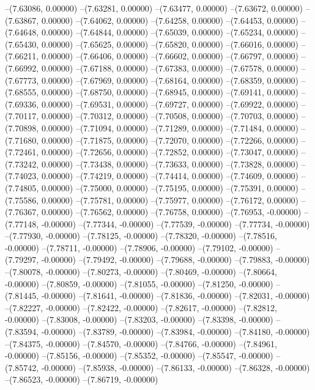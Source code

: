 --(7.63086, 0.00000)
--(7.63281, 0.00000)
--(7.63477, 0.00000)
--(7.63672, 0.00000)
--(7.63867, 0.00000)
--(7.64062, 0.00000)
--(7.64258, 0.00000)
--(7.64453, 0.00000)
--(7.64648, 0.00000)
--(7.64844, 0.00000)
--(7.65039, 0.00000)
--(7.65234, 0.00000)
--(7.65430, 0.00000)
--(7.65625, 0.00000)
--(7.65820, 0.00000)
--(7.66016, 0.00000)
--(7.66211, 0.00000)
--(7.66406, 0.00000)
--(7.66602, 0.00000)
--(7.66797, 0.00000)
--(7.66992, 0.00000)
--(7.67188, 0.00000)
--(7.67383, 0.00000)
--(7.67578, 0.00000)
--(7.67773, 0.00000)
--(7.67969, 0.00000)
--(7.68164, 0.00000)
--(7.68359, 0.00000)
--(7.68555, 0.00000)
--(7.68750, 0.00000)
--(7.68945, 0.00000)
--(7.69141, 0.00000)
--(7.69336, 0.00000)
--(7.69531, 0.00000)
--(7.69727, 0.00000)
--(7.69922, 0.00000)
--(7.70117, 0.00000)
--(7.70312, 0.00000)
--(7.70508, 0.00000)
--(7.70703, 0.00000)
--(7.70898, 0.00000)
--(7.71094, 0.00000)
--(7.71289, 0.00000)
--(7.71484, 0.00000)
--(7.71680, 0.00000)
--(7.71875, 0.00000)
--(7.72070, 0.00000)
--(7.72266, 0.00000)
--(7.72461, 0.00000)
--(7.72656, 0.00000)
--(7.72852, 0.00000)
--(7.73047, 0.00000)
--(7.73242, 0.00000)
--(7.73438, 0.00000)
--(7.73633, 0.00000)
--(7.73828, 0.00000)
--(7.74023, 0.00000)
--(7.74219, 0.00000)
--(7.74414, 0.00000)
--(7.74609, 0.00000)
--(7.74805, 0.00000)
--(7.75000, 0.00000)
--(7.75195, 0.00000)
--(7.75391, 0.00000)
--(7.75586, 0.00000)
--(7.75781, 0.00000)
--(7.75977, 0.00000)
--(7.76172, 0.00000)
--(7.76367, 0.00000)
--(7.76562, 0.00000)
--(7.76758, 0.00000)
--(7.76953, -0.00000)
--(7.77148, -0.00000)
--(7.77344, -0.00000)
--(7.77539, -0.00000)
--(7.77734, -0.00000)
--(7.77930, -0.00000)
--(7.78125, -0.00000)
--(7.78320, -0.00000)
--(7.78516, -0.00000)
--(7.78711, -0.00000)
--(7.78906, -0.00000)
--(7.79102, -0.00000)
--(7.79297, -0.00000)
--(7.79492, -0.00000)
--(7.79688, -0.00000)
--(7.79883, -0.00000)
--(7.80078, -0.00000)
--(7.80273, -0.00000)
--(7.80469, -0.00000)
--(7.80664, -0.00000)
--(7.80859, -0.00000)
--(7.81055, -0.00000)
--(7.81250, -0.00000)
--(7.81445, -0.00000)
--(7.81641, -0.00000)
--(7.81836, -0.00000)
--(7.82031, -0.00000)
--(7.82227, -0.00000)
--(7.82422, -0.00000)
--(7.82617, -0.00000)
--(7.82812, -0.00000)
--(7.83008, -0.00000)
--(7.83203, -0.00000)
--(7.83398, -0.00000)
--(7.83594, -0.00000)
--(7.83789, -0.00000)
--(7.83984, -0.00000)
--(7.84180, -0.00000)
--(7.84375, -0.00000)
--(7.84570, -0.00000)
--(7.84766, -0.00000)
--(7.84961, -0.00000)
--(7.85156, -0.00000)
--(7.85352, -0.00000)
--(7.85547, -0.00000)
--(7.85742, -0.00000)
--(7.85938, -0.00000)
--(7.86133, -0.00000)
--(7.86328, -0.00000)
--(7.86523, -0.00000)
--(7.86719, -0.00000)
